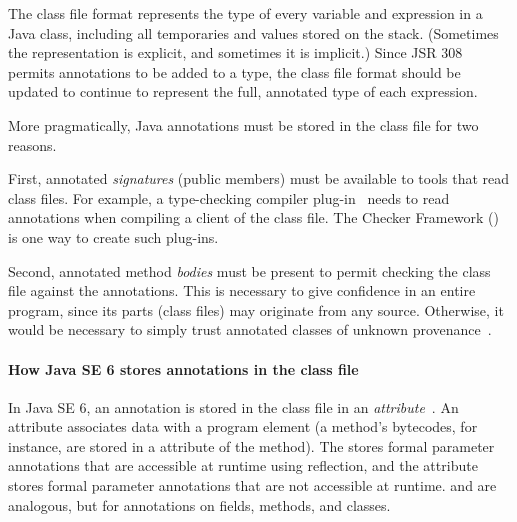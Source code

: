 \documentclass[10pt]{article}
\begin{document}
The class file format represents the type of every variable and expression
in a Java class, including all temporaries and values stored on the stack.
(Sometimes the representation is explicit, and sometimes it is implicit.)
Since JSR 308 permits annotations to be added to a type, the class file
format should be updated to continue to represent the full, annotated type
of each expression.


More pragmatically, Java annotations must be stored in the class file for two reasons.

First, annotated \emph{signatures} (public members) must be available to
tools that read class files.  For example, a type-checking compiler
plug-in~\cite{JSR269,PapiACPE2008} needs to read annotations when compiling
a client of the class file.  The Checker Framework
() is
one way to create such plug-ins.

Second, annotated method \emph{bodies} must be present to permit checking
the class file against the annotations.  This is necessary to give
confidence in an entire program, since its parts (class files) may
originate from any source.  Otherwise, it would be necessary to simply
trust annotated classes of unknown provenance~\cite{BurdyHP2007}.



\paragraph{How Java SE 6 stores annotations in the class file}


In Java SE 6, an annotation is stored in the class file in an
\emph{attribute}~\cite{JSR175,LindholmY99:CFF5}.  An attribute 
associates data with a program element (a
method's bytecodes, for instance, are stored in a 
attribute of the method). The \RuntimeVisibleParameterAnnotations stores formal parameter annotations that are accessible at runtime using reflection, and the
\RuntimeInvisibleParameterAnnotations attribute stores formal parameter annotations
that are not accessible at runtime.
\RuntimeVisibleAnnotations and 
\RuntimeInvisibleAnnotations are analogous, but for annotations on fields,
methods, and classes.
\end{document}
